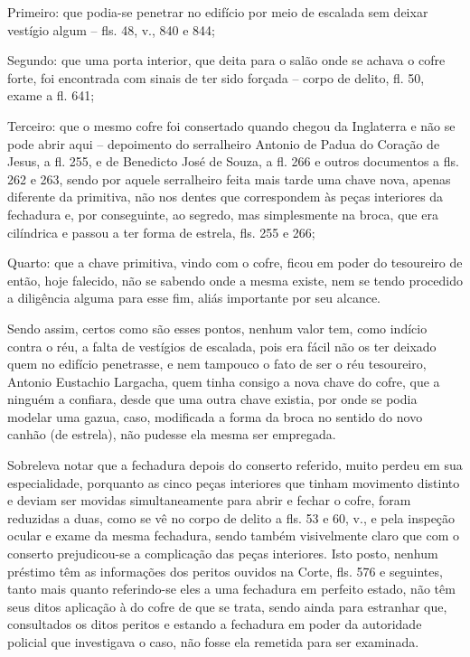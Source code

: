 Primeiro: que podia-se penetrar no edifício por meio de escalada sem
deixar vestígio algum -- fls. 48, v., 840 e 844;

Segundo: que uma porta interior, que deita para o salão onde se achava o
cofre forte, foi encontrada com sinais de ter sido forçada -- corpo de
delito, fl. 50, exame a fl. 641;

Terceiro: que o mesmo cofre foi consertado quando chegou da Inglaterra e
não se pode abrir aqui -- depoimento do serralheiro Antonio de Padua do
Coração de Jesus, a fl. 255, e de Benedicto José de Souza, a fl. 266 e
outros documentos a fls. 262 e 263, sendo por aquele serralheiro feita
mais tarde uma chave nova, apenas diferente da primitiva, não nos dentes
que correspondem às peças interiores da fechadura e, por conseguinte, ao
segredo, mas simplesmente na broca, que era cilíndrica e passou a ter
forma de estrela, fls. 255 e 266;

Quarto: que a chave primitiva, vindo com o cofre, ficou em poder do
tesoureiro de então, hoje falecido, não se sabendo onde a mesma existe,
nem se tendo procedido a diligência alguma para esse fim, aliás
importante por seu alcance.

Sendo assim, certos como são esses pontos, nenhum valor tem, como
indício contra o réu, a falta de vestígios de escalada, pois era fácil
não os ter deixado quem no edifício penetrasse, e nem tampouco o fato de
ser o réu tesoureiro, Antonio Eustachio Largacha, quem tinha consigo a
nova chave do cofre, que a ninguém a confiara, desde que uma outra chave
existia, por onde se podia modelar uma gazua, caso, modificada a forma
da broca no sentido do novo canhão (de estrela), não pudesse ela mesma
ser empregada.

Sobreleva notar que a fechadura depois do conserto referido, muito
perdeu em sua especialidade, porquanto as cinco peças interiores que
tinham movimento distinto e deviam ser movidas simultaneamente para
abrir e fechar o cofre, foram reduzidas a duas, como se vê no corpo de
delito a fls. 53 e 60, v., e pela inspeção ocular e exame da mesma
fechadura, sendo também visivelmente claro que com o conserto
prejudicou-se a complicação das peças interiores. Isto posto, nenhum
préstimo têm as informações dos peritos ouvidos na Corte, fls. 576 e
seguintes, tanto mais quanto referindo-se eles a uma fechadura em
perfeito estado, não têm seus ditos aplicação à do cofre de que se
trata, sendo ainda para estranhar que, consultados os ditos peritos e
estando a fechadura em poder da autoridade policial que investigava o
caso, não fosse ela remetida para ser examinada.

